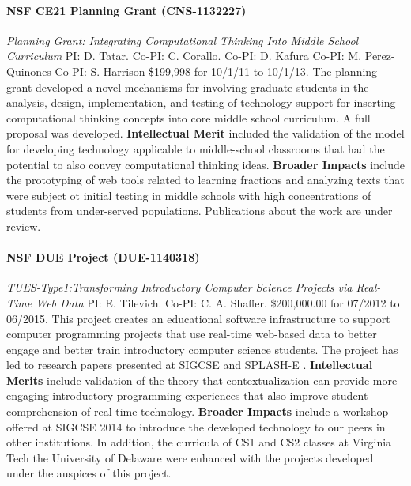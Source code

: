 \documentclass[11pt]{article}
\begin{document}
\paragraph{NSF CE21 Planning Grant (CNS-1132227)}
\emph{Planning Grant: Integrating Computational Thinking Into Middle School Curriculum}
PI: D. Tatar.
Co-PI: C. Corallo.
Co-PI: D. Kafura
Co-PI: M. Perez-Quinones
Co-PI: S. Harrison
\$199,998 for 10/1/11 to 10/1/13.
The planning grant developed a novel mechanisms for involving graduate students in the analysis, design, implementation, and testing of technology support for inserting computational thinking concepts into core middle school curriculum. A full proposal was developed. \textbf{Intellectual Merit} included the validation of the model for developing technology applicable to middle-school classrooms that had the potential to also convey computational thinking ideas.  \textbf{Broader Impacts} include the prototyping of web tools related to learning fractions and analyzing texts that were subject ot initial testing in middle schools with high concentrations of students from under-served populations. Publications about the work are under review.

\paragraph{NSF DUE Project (DUE-1140318)}
\emph{TUES-Type1:Transforming Introductory Computer Science Projects via Real-Time Web Data}
PI: E. Tilevich.
Co-PI: C. A. Shaffer.
\$200,000.00 for 07/2012 to 06/2015.
This project creates an educational software infrastructure to support
computer programming projects that use real-time web-based data to better
engage and better train introductory computer science students.
The project has led to research papers presented at SIGCSE \cite{bart-rtw-success} and
SPLASH-E \cite{bart-rtw}.
\textbf{Intellectual Merits} include validation of the theory that contextualization can provide more engaging introductory programming experiences that also improve student comprehension of real-time technology. 
\textbf{Broader Impacts} include a workshop offered at SIGCSE 2014 to introduce the
developed technology to our peers in other institutions\cite{bart-rtw-workshop}. In
addition, the curricula of CS1 and CS2 classes at Virginia Tech the
University of Delaware were enhanced
with the projects developed under the auspices of this project.

%

\newpage
\pagestyle{empty}


\end{document}
